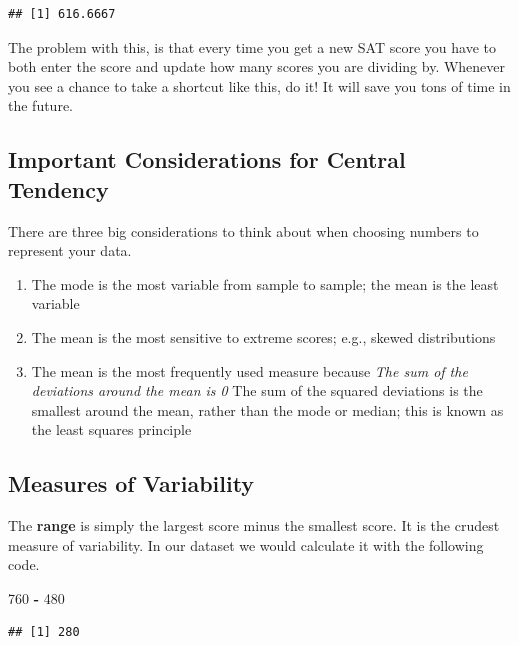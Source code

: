 \documentclass[]{book}
\newenvironment{Shaded}{\begin{snugshade}}{\end{snugshade}}
\newcommand{\DecValTok}[1]{\textcolor[rgb]{0.00,0.00,0.81}{#1}}
\newcommand{\StringTok}[1]{\textcolor[rgb]{0.31,0.60,0.02}{#1}}
\newcommand{\OperatorTok}[1]{\textcolor[rgb]{0.81,0.36,0.00}{\textbf{#1}}}
\providecommand{\tightlist}{%
  \setlength{\itemsep}{0pt}\setlength{\parskip}{0pt}}
\theoremstyle{definition}
\theoremstyle{definition}
\theoremstyle{definition}
\theoremstyle{remark}
\begin{document}
\begin{verbatim}
## [1] 616.6667
\end{verbatim}

The problem with this, is that every time you get a new SAT score you
have to both enter the score and update how many scores you are dividing
by. Whenever you see a chance to take a shortcut like this, do it! It
will save you tons of time in the future.

\subsection{Important Considerations for Central
Tendency}\label{important-considerations-for-central-tendency}

There are three big considerations to think about when choosing numbers
to represent your data.

\begin{enumerate}
\def\labelenumi{\arabic{enumi}.}
\tightlist
\item
  The mode is the most variable from sample to sample; the mean is the
  least variable
\item
  The mean is the most sensitive to extreme scores; e.g., skewed
  distributions
\item
  The mean is the most frequently used measure because \emph{The sum of
  the deviations around the mean is 0 }The sum of the squared deviations
  is the smallest around the mean, rather than the mode or median; this
  is known as the least squares principle
\end{enumerate}

\subsection{Measures of Variability}\label{measures-of-variability}

The \textbf{range} is simply the largest score minus the smallest score.
It is the crudest measure of variability. In our dataset we would
calculate it with the following code.

\begin{Shaded}
\begin{Highlighting}[]
\DecValTok{760} \OperatorTok{-}\StringTok{ }\DecValTok{480}
\end{Highlighting}
\end{Shaded}

\begin{verbatim}
## [1] 280
\end{verbatim}
\end{document}

